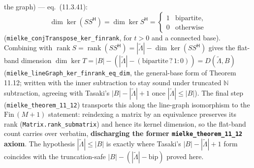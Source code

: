 \documentclass[a4paper,11pt]{article}
\begin{document}
the graph) --- eq.~(11.3.41):
\[
  \dim\ker(SS^{\mathsf H}) = \dim\ker S^{\mathsf H}
    = \begin{cases} 1 & \text{bipartite},\\ 0 & \text{otherwise}\end{cases}
\]
(\texttt{mielke\_conjTranspose\_ker\_finrank}, for $t>0$ and a connected base).  Combining
with $\operatorname{rank}S = \operatorname{rank}(SS^{\mathsf H}) = |\tilde\Lambda| -
\dim\ker(SS^{\mathsf H})$ gives the flat-band dimension
$\dim\ker T = |B| - (|\tilde\Lambda| - (\text{bipartite}\,?\,1:0)) = D(\tilde\Lambda,B)$
(\texttt{mielke\_lineGraph\_ker\_finrank\_eq\_dim}, the general-base form of Theorem 11.12;
written with the inner subtraction to stay sound under truncated $\mathbb N$ subtraction,
agreeing with Tasaki's $|B|-|\tilde\Lambda|+1$ once $|\tilde\Lambda|\le|B|$).  The
final step (\texttt{mielke\_theorem\_11\_12}) transports this along the line-graph
isomorphism to the $\mathrm{Fin}\,(M{+}1)$ statement: reindexing a matrix by an
equivalence preserves its rank (\texttt{Matrix.rank\_submatrix}) and hence its kernel
dimension, so the flat-band count carries over verbatim, \textbf{discharging the former
\texttt{mielke\_theorem\_11\_12} axiom}.  The hypothesis $|\tilde\Lambda|\le|B|$ is exactly
where Tasaki's $|B|-|\tilde\Lambda|+1$ form coincides with the truncation-safe
$|B|-(|\tilde\Lambda|-\mathrm{bip})$ proved here.
\end{document}

